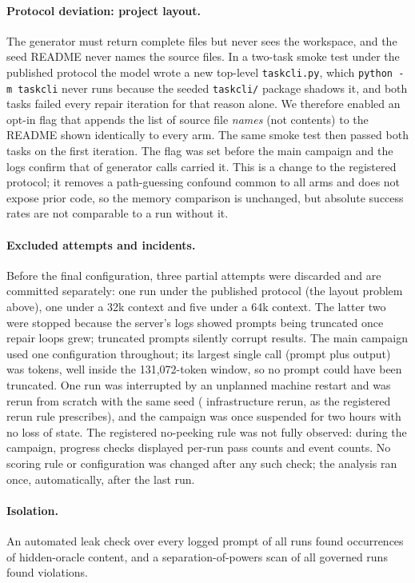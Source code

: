 \documentclass[11pt]{article}
\begin{document}
\paragraph{Protocol deviation: project layout.} The generator must return
complete files but never sees the workspace, and the seed README never names
the source files. In a two-task smoke test under the published protocol the
model wrote a new top-level \texttt{taskcli.py}, which \texttt{python -m
taskcli} never runs because the seeded \texttt{taskcli/} package shadows it,
and both tasks failed every repair iteration for that reason alone. We
therefore enabled an opt-in flag that appends the list of source file
\emph{names} (not contents) to the README shown identically to every arm. The
same smoke test then passed both tasks on the first iteration. The flag was
set before the main campaign and the logs confirm that \NLayoutCalls{} of
\NGeneratorCalls{} generator calls carried it. This is a change to the
registered protocol; it removes a path-guessing confound common to all arms
and does not expose prior code, so the memory comparison is unchanged, but
absolute success rates are not comparable to a run without it.

\paragraph{Excluded attempts and incidents.} Before the final configuration,
three partial attempts were discarded and are committed separately: one run
under the published protocol (the layout problem above), one under a 32k
context and five under a 64k context. The latter two were stopped because the
server's logs showed prompts being truncated once repair loops grew; truncated
prompts silently corrupt results. The main campaign used one configuration
throughout; its largest single call (prompt plus output) was \NPeakCallTokens{}
tokens, well inside the 131{,}072-token window, so no prompt could have been
truncated. One run was interrupted by an
unplanned machine restart and was rerun from scratch with the same seed
(\NInfraReruns{} infrastructure rerun, as the registered rerun rule
prescribes), and the campaign was once suspended for two hours with no loss of
state. The registered no-peeking rule was not fully observed: during the
campaign, progress checks displayed per-run pass counts and event counts. No
scoring rule or configuration was changed after any such check; the
analysis ran once, automatically, after the last run.

\paragraph{Isolation.} An automated leak check over every logged prompt of all
\NLeakRuns{} runs found \NLeakHits{} occurrences of hidden-oracle content, and
a separation-of-powers scan of all \NSepGovRuns{} governed runs found
\NSepGovHits{} violations.
\end{document}
